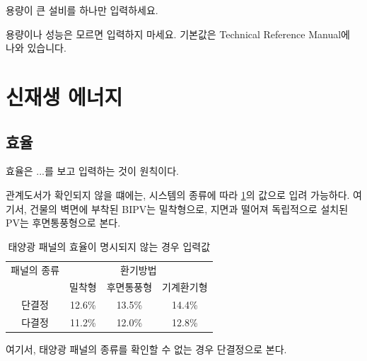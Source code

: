 용량이 큰 설비를 하나만 입력하세요.

용량이나 성능은 모르면 입력하지 마세요. 기본값은 Technical Reference Manual에 나와 있습니다.

\section{신재생 에너지}

\subsection{효율}

효율은 ...를 보고 입력하는 것이 원칙이다.

관계도서가 확인되지 않을 떄에는, 시스템의 종류에 따라 \cref{tbl:PVpanel-efficiency}의 값으로 입려 가능하다. 여기서, 건물의 벽면에 부착된 BIPV는 밀착형으로, 지면과 떨어져 독립적으로 설치된 PV는 후면통풍형으로 본다.

\begin{table}[htbp]
    \caption{태양광 패널의 효율이 명시되지 않는 경우 입력값}
    \label{tbl:PVpanel-efficiency}
    \centering
    \begin{tabular}{cccc}
        \toprule
        패널의 종류 & \multicolumn{3}{c}{환기방법} \\
        & 밀착형 & 후면통풍형 & 기계환기형 \\
        \midrule
        단결정 & 12.6\% & 13.5\% & 14.4\% \\
        다결정 & 11.2\% & 12.0\% & 12.8\% \\
        \bottomrule
    \end{tabular}
\end{table}

여기서, 태양광 패널의 종류를 확인할 수 없는 경우 단결정으로 본다.